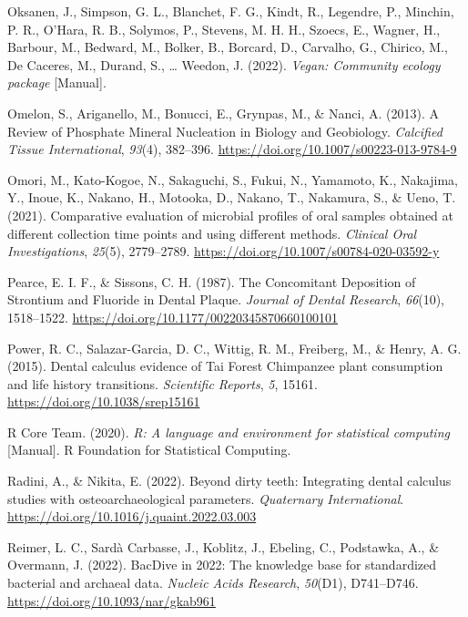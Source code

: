 \documentclass[
  b5paper,
]{book}
\newlength{\cslhangindent}
\newenvironment{CSLReferences}[2] %
 {\begin{list}{}{%
  \setlength{\itemindent}{0pt}
  \setlength{\leftmargin}{0pt}
  \setlength{\parsep}{0pt}
  \ifodd #1
   \setlength{\leftmargin}{\cslhangindent}
   \setlength{\itemindent}{-1\cslhangindent}
  \fi
  \setlength{\itemsep}{#2\baselineskip}}}
 {\end{list}}
\begin{document}
\begin{CSLReferences}{1}{0}
Oksanen, J., Simpson, G. L., Blanchet, F. G., Kindt, R., Legendre, P.,
Minchin, P. R., O'Hara, R. B., Solymos, P., Stevens, M. H. H., Szoecs,
E., Wagner, H., Barbour, M., Bedward, M., Bolker, B., Borcard, D.,
Carvalho, G., Chirico, M., De Caceres, M., Durand, S., \ldots{} Weedon,
J. (2022). \emph{Vegan: {Community} ecology package} {[}Manual{]}.

Omelon, S., Ariganello, M., Bonucci, E., Grynpas, M., \& Nanci, A.
(2013). A {Review} of {Phosphate Mineral Nucleation} in {Biology} and
{Geobiology}. \emph{Calcified Tissue International}, \emph{93}(4),
382--396. \url{https://doi.org/10.1007/s00223-013-9784-9}

Omori, M., Kato-Kogoe, N., Sakaguchi, S., Fukui, N., Yamamoto, K.,
Nakajima, Y., Inoue, K., Nakano, H., Motooka, D., Nakano, T., Nakamura,
S., \& Ueno, T. (2021). Comparative evaluation of microbial profiles of
oral samples obtained at different collection time points and using
different methods. \emph{Clinical Oral Investigations}, \emph{25}(5),
2779--2789. \url{https://doi.org/10.1007/s00784-020-03592-y}

Pearce, E. I. F., \& Sissons, C. H. (1987). The {Concomitant Deposition}
of {Strontium} and {Fluoride} in {Dental Plaque}. \emph{Journal of
Dental Research}, \emph{66}(10), 1518--1522.
\url{https://doi.org/10.1177/00220345870660100101}

Power, R. C., Salazar-Garcia, D. C., Wittig, R. M., Freiberg, M., \&
Henry, A. G. (2015). Dental calculus evidence of {Tai Forest Chimpanzee}
plant consumption and life history transitions. \emph{Scientific
Reports}, \emph{5}, 15161. \url{https://doi.org/10.1038/srep15161}

R Core Team. (2020). \emph{R: {A} language and environment for
statistical computing} {[}Manual{]}. {R Foundation for Statistical
Computing}.

Radini, A., \& Nikita, E. (2022). Beyond dirty teeth: {Integrating}
dental calculus studies with osteoarchaeological parameters.
\emph{Quaternary International}.
\url{https://doi.org/10.1016/j.quaint.2022.03.003}

Reimer, L. C., Sardà Carbasse, J., Koblitz, J., Ebeling, C., Podstawka,
A., \& Overmann, J. (2022). {BacDive} in 2022: The knowledge base for
standardized bacterial and archaeal data. \emph{Nucleic Acids Research},
\emph{50}(D1), D741--D746. \url{https://doi.org/10.1093/nar/gkab961}


\end{CSLReferences}
\end{document}

